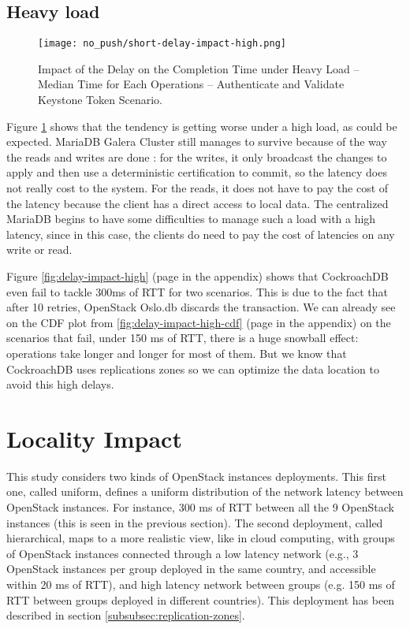\subsection{Heavy load}

\begin{figure}[H]
  \vspace{-10pt}
  \centering
  \centerline{\texttt{[image: no\_push/short-delay-impact-high.png]}}
  \vspace{-5pt}
  \caption{Impact of the Delay on the Completion Time under Heavy Load – Median Time for Each Operations – Authenticate and Validate Keystone Token Scenario.}
  \vspace{-5pt}
  \label{fig:short-delay-impact-high}
\end{figure}

Figure \ref{fig:short-delay-impact-high} shows that the tendency is getting worse under a high load, as could be expected. MariaDB Galera Cluster still manages to survive because of the way the reads and writes are done : for the writes, it only broadcast the changes to apply and then use a deterministic certification to commit, so the latency does not really cost to the system. For the reads, it does not have to pay the cost of the latency because the client has a direct access to local data. The centralized MariaDB begins to have some difficulties to manage such a load with a high latency, since in this case, the clients do need to pay the cost of latencies on any write or read.

Figure \ref{fig:delay-impact-high} (page \pageref{fig:delay-impact-high} in the appendix) shows that CockroachDB even fail to tackle 300ms of RTT for two scenarios. This is due to the fact that after 10 retries, OpenStack Oslo.db discards the transaction. We can already see on the CDF plot from \ref{fig:delay-impact-high-cdf} (page \pageref{fig:delay-impact-high-cdf} in the appendix) on the scenarios that fail, under 150 ms of RTT, there is a huge snowball effect: operations take longer and longer for most of them. But we know that CockroachDB uses replications zones so we can optimize the data location to avoid this high delays.

\section{Locality Impact}

This study considers two kinds of OpenStack instances deployments. This first one, called uniform, defines a uniform distribution of the network latency between OpenStack instances. For instance, 300 ms of RTT between all the 9 OpenStack instances (this is seen in the previous section). The second deployment, called hierarchical, maps to a more realistic view, like in cloud computing, with groups of OpenStack instances connected through a low latency network (e.g., 3 OpenStack instances per group deployed in the same country, and accessible within 20 ms of RTT), and high latency network between groups (e.g. 150 ms of RTT between groups deployed in different countries). This deployment has been described in section \ref{subsubsec:replication-zones}.

